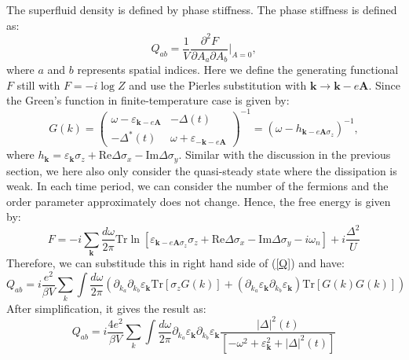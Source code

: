 \documentclass[aps,onecolumn,superscriptaddress,notitlepage,longbibliography]{revtex4-1}
\begin{document}
The superfluid density is defined by phase stiffness. The phase stiffness is
defined as:
\begin{equation}
  Q_{a b} = \frac{1}{V} \frac{\partial^2 F}{\partial A_a \partial A_b} |_{A =
  0} , \label{Q}
\end{equation}
where $a$ and $b$ represents spatial indices. Here we define the generating functional $F$ still with $F=-i\log Z$ and use the Pierles
substitution with $\mathbf{k} \rightarrow \mathbf{k}- e\mathbf{A}$.
Since the Green's function in finite-temperature case is given by:
\begin{equation}
  G (k) = \left(\begin{array}{cc}
    \omega - \varepsilon_{\mathbf{k}- e\mathbf{A}} & - \Delta (t)\\
    - \Delta^{\ast} (t) & \omega + \varepsilon_{-\mathbf{k}-
    e\mathbf{A}}
  \end{array}\right)^{- 1} = (\omega - h_{\mathbf{k}- e\mathbf{A}
  \sigma_z})^{- 1},
\end{equation}
where $h_{\mathbf{k}} = \varepsilon_{\mathbf{k}}
\sigma_z + \text{Re} \Delta \sigma_x - \text{Im} \Delta \sigma_y$. Similar with the discussion in the previous section, we here also only consider the quasi-steady state where the dissipation is weak. In each time period, we can consider the number of the fermions and the order parameter approximately does not change. Hence, the free energy is given by:
\begin{equation}
  F = - i \sum_{\mathbf{k}}\frac{d\omega}{2\pi} \text{Tr} \ln
  [\varepsilon_{\mathbf{k}- e\mathbf{A} \sigma_z} \sigma_z + \text{Re}
  \Delta \sigma_x - \text{Im} \Delta \sigma_y - i \omega_n] +i\frac{\Delta^2}{U}
\end{equation}
Therefore, we can substitude this in right hand side of (\ref{Q}) and have:
\begin{equation}
  Q_{a b} = i\frac{e^2}{\beta V} \sum_k\int\frac{d\omega}{2\pi} (\partial_{k_a} \partial_{k_b}
  \varepsilon_{\mathbf{k}} \text{Tr} [\sigma_z G (k)] + (\partial_{k_a}
  \varepsilon_{\mathbf{k}} \partial_{k_b} \varepsilon_{\mathbf{k}})
  \text{Tr} [G (k) G (k)])
\end{equation}
After simplification, it gives the result as:
\begin{equation}
  Q_{a b} = i\frac{4 e^2}{\beta V} \sum_k\int\frac{d\omega}{2\pi} \partial_{k_a}
  \varepsilon_{\mathbf{k}} \partial_{k_b} \varepsilon_{\mathbf{k}} \frac{|
  \Delta |^2 (t)}{[-\omega^2 + \varepsilon_{\mathbf{k}}^2 + | \Delta |^2
  (t)]}
\end{equation}
\end{document}
